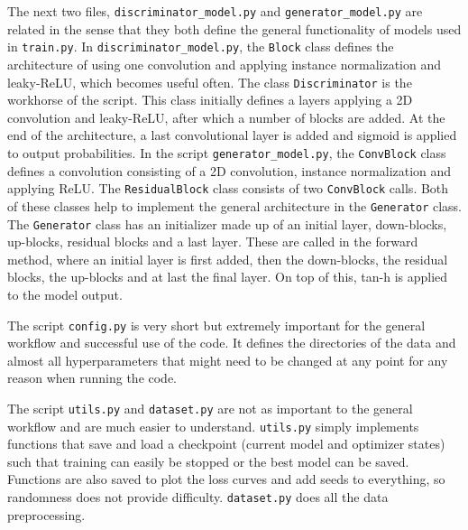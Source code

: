 \documentclass[12pt, fleqn, titlepage]{article}
\begin{document}
The next two files, \texttt{discriminator\_model.py} and \texttt{generator\_model.py} are related in the sense that they both define the general functionality of models used in \texttt{train.py}. In \texttt{discriminator\_model.py}, the \texttt{Block} class defines the architecture of using one convolution and applying instance normalization and leaky-ReLU, which becomes useful often. The class \texttt{Discriminator} is the workhorse of the script. This class initially defines a layers applying a 2D convolution and leaky-ReLU, after which a number of blocks are added. At the end of the architecture, a last convolutional layer is added and sigmoid is applied to output probabilities. In the script \texttt{generator\_model.py}, the \texttt{ConvBlock} class defines a convolution consisting of a 2D convolution, instance normalization and applying ReLU. The \texttt{ResidualBlock} class consists of two \texttt{ConvBlock} calls. Both of these classes help to implement the general architecture in the \texttt{Generator} class. The \texttt{Generator} class has an initializer made up of an initial layer, down-blocks, up-blocks, residual blocks and a last layer. These are called in the forward method, where an initial layer is first added, then the down-blocks, the residual blocks, the up-blocks and at last the final layer. On top of this, tan-h is applied to the model output.

The script \texttt{config.py} is very short but extremely important for the general workflow and successful use of the code. It defines the directories of the data and almost all hyperparameters that might need to be changed at any point for any reason when running the code.

The script \texttt{utils.py} and \texttt{dataset.py} are not as important to the general workflow and are much easier to understand. \texttt{utils.py} simply implements functions that save and load a checkpoint (current model and optimizer states) such that training can easily be stopped or the best model can be saved. Functions are also saved to plot the loss curves and add seeds to everything, so randomness does not provide difficulty. \texttt{dataset.py} does all the data preprocessing.
\end{document}
